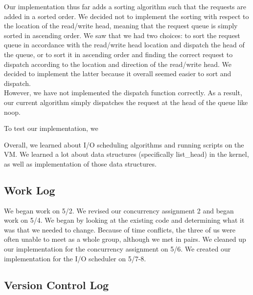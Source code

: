 \documentclass[journal, letterpaper, draftclsnofoot, onecolumn, 10pt]{IEEEtran}
\begin{document}
Our implementation thus far adds a sorting algorithm such that the requests are added in a sorted order. We decided not to implement
the sorting with respect to the location of the read/write head, meaning that the request queue is simply sorted in ascending order.
We saw that we had two choices: to sort the request queue in accordance with the read/write head location and dispatch the head of
the queue, or to sort it in ascending order and finding the correct request to dispatch according to the location and direction of
the read/write head. We decided to implement the latter because it overall seemed easier to sort and dispatch. \\

However, we have not implemented the dispatch function correctly. As a result, our current algorithm simply dispatches the request
at the head of the queue like noop.


To test our implementation, we


Overall, we learned about I/O scheduling algorithms and running scripts on the VM. We learned a lot about data structures
(specifically list\_head) in the kernel, as well as implementation of those data structures.\\

\subsection{Work Log}
We began work on 5/2. We revised our concurrency assignment 2 and began work on 5/4. We began by looking
at the existing code and determining what it was that we needed to change. Because of time conflicts, the three of us were often unable
to meet as a whole group, although we met in pairs. We cleaned up our implementation for the concurrency assignment on 5/6.
We created our implementation for the I/O scheduler on 5/7-8.

\clearpage
\subsection{Version Control Log}



\FloatBarrier
\end{document}
